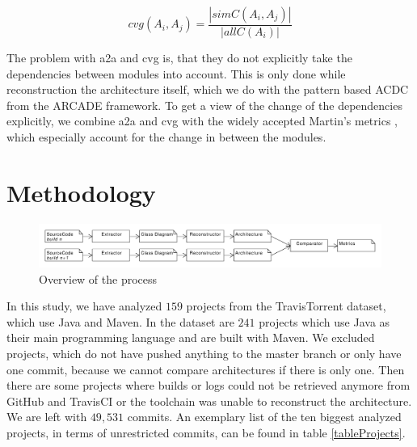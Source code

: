 \documentclass[sigplan, anonymous, review]{acmart}
\begin{document}
\begin{equation} \label{eq:cvg}
cvg(A_i, A_j) = \frac{|simC(A_i, A_j)|}{|allC(A_i)|}
\end{equation}

The problem with a2a and cvg is, that they do not explicitly take the dependencies between modules into account. This is only done while reconstruction the architecture itself, which we do with the pattern based ACDC from the ARCADE framework. 
To get a view of the change of the dependencies explicitly, we combine a2a and cvg with the widely accepted Martin's metrics \cite{Val-MartinsMet}, which especially account for the change in between the modules. 

\section{Methodology}

\begin{figure}[!t]
	\centering
	\includegraphics[width=7in]{assets/overview.pdf}
	\caption{Overview of the process}
	\label{overview}
\end{figure}



In this study, we have analyzed $159$ projects from the TravisTorrent dataset, which use Java and Maven. In the dataset are $241$ projects which use Java as their main programming language and are built with Maven. We excluded projects, which do not have pushed anything to the master branch or only have one commit, because we cannot compare architectures if there is only one. Then there are some projects where builds or logs could not be retrieved anymore from GitHub and TravisCI or the toolchain was unable to reconstruct the architecture. We are left with $49,531$ commits. An exemplary list of the ten biggest analyzed projects, in terms of unrestricted commits, can be found in table \ref{tableProjects}.
\end{document}
